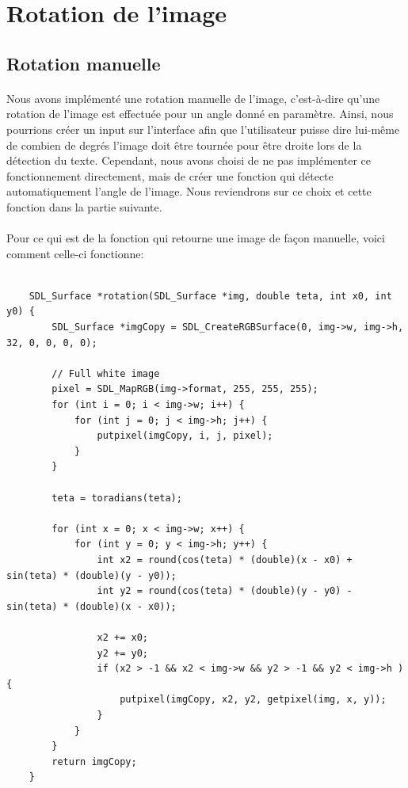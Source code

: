 \documentclass{article}
\begin{document}
\section{Rotation de l'image}
\subsection{Rotation manuelle}
\paragraph{}
Nous avons implémenté une rotation manuelle de l'image, c'est-à-dire qu'une rotation de l'image est effectuée pour un angle donné en paramètre. Ainsi, nous pourrions créer un input sur l'interface afin que l'utilisateur puisse dire lui-même de combien de degrés l'image doit être tournée pour être droite lors de la détection du texte. Cependant, nous avons choisi de ne pas implémenter ce fonctionnement directement, mais de créer une fonction qui détecte automatiquement l'angle de l'image. Nous reviendrons sur ce choix et cette fonction dans la partie suivante.

\paragraph{}
Pour ce qui est de la fonction qui retourne une image de façon manuelle, voici comment celle-ci fonctionne: \\

\begin{lstlisting}

	SDL_Surface *rotation(SDL_Surface *img, double teta, int x0, int y0) {
        SDL_Surface *imgCopy = SDL_CreateRGBSurface(0, img->w, img->h, 32, 0, 0, 0, 0);
        
        // Full white image
        pixel = SDL_MapRGB(img->format, 255, 255, 255);
        for (int i = 0; i < img->w; i++) {
            for (int j = 0; j < img->h; j++) {
                putpixel(imgCopy, i, j, pixel);
            }
        }
        
        teta = toradians(teta);

        for (int x = 0; x < img->w; x++) {
            for (int y = 0; y < img->h; y++) {
                int x2 = round(cos(teta) * (double)(x - x0) + sin(teta) * (double)(y - y0));
                int y2 = round(cos(teta) * (double)(y - y0) - sin(teta) * (double)(x - x0));
                
                x2 += x0;
                y2 += y0;
                if (x2 > -1 && x2 < img->w && y2 > -1 && y2 < img->h ) {
                    putpixel(imgCopy, x2, y2, getpixel(img, x, y));
                }
            }
        }
        return imgCopy;
    }
\end{lstlisting}
\end{document}
